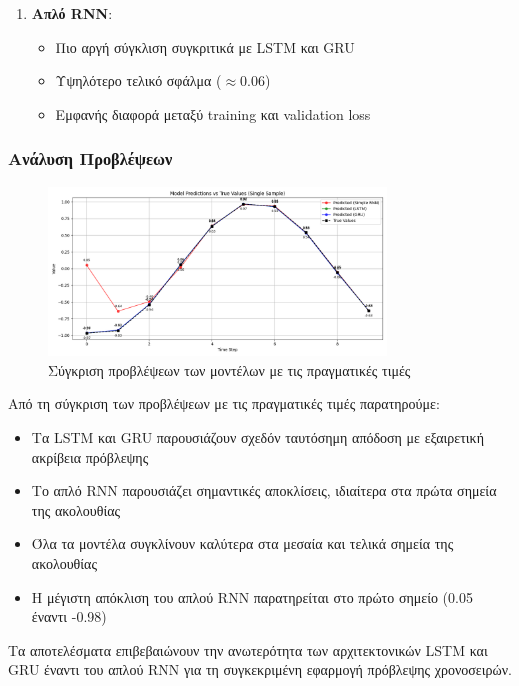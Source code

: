 \documentclass[a4paper,12pt]{article}
\begin{document}
\begin{enumerate}
    \item \textbf{Απλό RNN}:
          \begin{itemize}
              \item Πιο αργή σύγκλιση συγκριτικά με LSTM και GRU
              \item Υψηλότερο τελικό σφάλμα ($\approx 0.06$)
              \item Εμφανής διαφορά μεταξύ training και validation loss
          \end{itemize}
\end{enumerate}

\subsubsection*{Ανάλυση Προβλέψεων}

\begin{figure}[h]
    \centering
    \includegraphics[width=0.8\textwidth]{pred_step8.png}
    \caption{Σύγκριση προβλέψεων των μοντέλων με τις πραγματικές τιμές}
    \label{fig:predictions}
\end{figure}

Από τη σύγκριση των προβλέψεων με τις πραγματικές τιμές παρατηρούμε:

\begin{itemize}
    \item Τα LSTM και GRU παρουσιάζουν σχεδόν ταυτόσημη απόδοση με εξαιρετική ακρίβεια πρόβλεψης
    \item Το απλό RNN παρουσιάζει σημαντικές αποκλίσεις, ιδιαίτερα στα πρώτα σημεία της ακολουθίας
    \item Όλα τα μοντέλα συγκλίνουν καλύτερα στα μεσαία και τελικά σημεία της ακολουθίας
    \item Η μέγιστη απόκλιση του απλού RNN παρατηρείται στο πρώτο σημείο (0.05 έναντι -0.98)
\end{itemize}

Τα αποτελέσματα επιβεβαιώνουν την ανωτερότητα των αρχιτεκτονικών LSTM και GRU έναντι του απλού RNN για τη συγκεκριμένη εφαρμογή πρόβλεψης χρονοσειρών.
\end{document}
